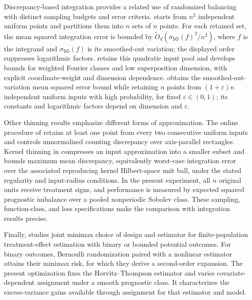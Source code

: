 Discrepancy-based integration provides a related use of randomized balancing with distinct sampling budgets and error criteria. \citet[Theorem 1.1 and Section 3.1]{BansalJiang2024QMC} starts from \(n^2\) independent uniform points and partitions them into \(n\) sets of \(n\) points. For each retained set, the mean squared integration error is bounded by \(\widetilde O_d(\sigma_{\mathsf{SO}}(f)^2/n^2)\), where \(f\) is the integrand and \(\sigma_{\mathsf{SO}}(f)\) is its smoothed-out variation; the displayed order suppresses logarithmic factors. \citet[Theorem 1.1, Section 2.2, and Theorem 3.3]{ChenJiangKirk2025HighDimensionalQMC} retains this quadratic input pool and develops bounds for weighted Fourier classes and low superposition dimension, with explicit coordinate-weight and dimension dependence. \citet[Theorem 1.2]{EzeunalaJhaJiang2026QMCII} obtains the smoothed-out-variation mean squared error bound while retaining \(n\) points from \((1+\varepsilon)n\) independent uniform inputs with high probability, for fixed \(\varepsilon\in(0,1)\); its constants and logarithmic factors depend on dimension and \(\varepsilon\).

Other thinning results emphasize different forms of approximation. The online procedure of \citet[Theorems 1--2]{Dwivedi2019} retains at least one point from every two consecutive uniform inputs and controls unnormalized counting discrepancy over axis-parallel rectangles. Kernel thinning in \citet[Theorem 1 and Corollary 1]{Dwivedi2024} compresses an input approximation into a smaller subset and bounds maximum mean discrepancy, equivalently worst-case integration error over the associated reproducing kernel Hilbert-space unit ball, under the stated regularity and input-radius conditions. In the present experiment, all \(n\) original units receive treatment signs, and performance is measured by expected squared prognostic imbalance over a pooled nonperiodic Sobolev class. These sampling, function-class, and loss specifications make the comparison with integration results precise.

Finally, \citet[Theorems 2.2--2.3 and 3.1]{SudijonoDobribanTchetgen2026Minimax} studies joint minimax choice of design and estimator for finite-population treatment-effect estimation with binary or bounded potential outcomes. For binary outcomes, Bernoulli randomization paired with a nonlinear estimator attains their minimax risk, for which they derive a second-order expansion. The present optimization fixes the Horvitz--Thompson estimator and varies covariate-dependent assignment under a smooth prognostic class. It characterizes the excess-variance gains available through assignment for that estimator and model.
